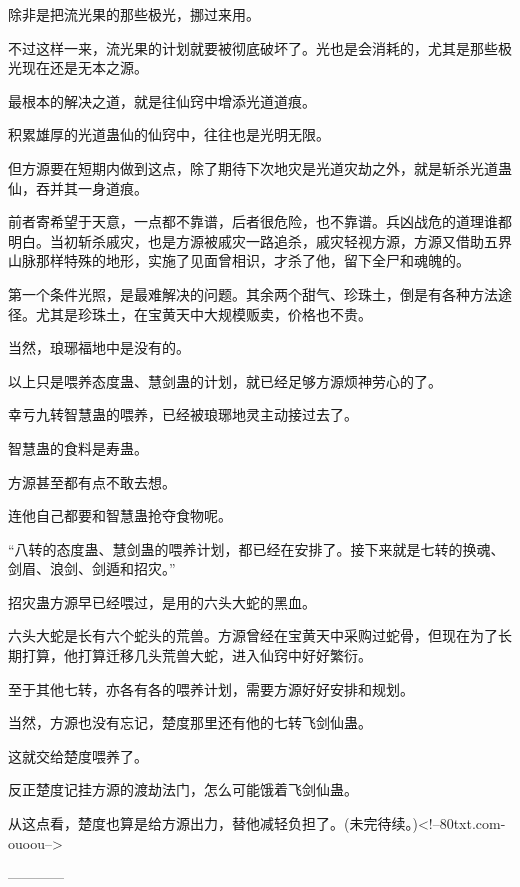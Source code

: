 \begin{this_body}
除非是把流光果的那些极光，挪过来用。

不过这样一来，流光果的计划就要被彻底破坏了。光也是会消耗的，尤其是那些极光现在还是无本之源。

最根本的解决之道，就是往仙窍中增添光道道痕。

积累雄厚的光道蛊仙的仙窍中，往往也是光明无限。

但方源要在短期内做到这点，除了期待下次地灾是光道灾劫之外，就是斩杀光道蛊仙，吞并其一身道痕。

前者寄希望于天意，一点都不靠谱，后者很危险，也不靠谱。兵凶战危的道理谁都明白。当初斩杀戚灾，也是方源被戚灾一路追杀，戚灾轻视方源，方源又借助五界山脉那样特殊的地形，实施了见面曾相识，才杀了他，留下全尸和魂魄的。

第一个条件光照，是最难解决的问题。其余两个甜气、珍珠土，倒是有各种方法途径。尤其是珍珠土，在宝黄天中大规模贩卖，价格也不贵。

当然，琅琊福地中是没有的。

以上只是喂养态度蛊、慧剑蛊的计划，就已经足够方源烦神劳心的了。

幸亏九转智慧蛊的喂养，已经被琅琊地灵主动接过去了。

智慧蛊的食料是寿蛊。

方源甚至都有点不敢去想。

连他自己都要和智慧蛊抢夺食物呢。

“八转的态度蛊、慧剑蛊的喂养计划，都已经在安排了。接下来就是七转的换魂、剑眉、浪剑、剑遁和招灾。”

招灾蛊方源早已经喂过，是用的六头大蛇的黑血。

六头大蛇是长有六个蛇头的荒兽。方源曾经在宝黄天中采购过蛇骨，但现在为了长期打算，他打算迁移几头荒兽大蛇，进入仙窍中好好繁衍。

至于其他七转，亦各有各的喂养计划，需要方源好好安排和规划。

当然，方源也没有忘记，楚度那里还有他的七转飞剑仙蛊。

这就交给楚度喂养了。

反正楚度记挂方源的渡劫法门，怎么可能饿着飞剑仙蛊。

从这点看，楚度也算是给方源出力，替他减轻负担了。(未完待续。)<!--80txt.com-ouoou-->

------------

\end{this_body}

